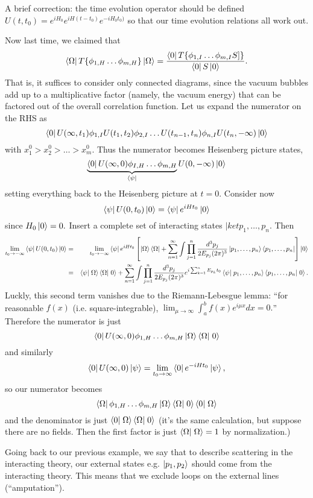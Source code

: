 A brief correction: the time evolution operator should be defined
$U(t,t_0)=e^{iH_0}e^{iH(t-t_0)}e^{-iH_0 t_0)}$ so that our time evolution relations all work out.

Now last time, we claimed that
$$\left< \Omega \right|T\{\phi_{1,H}\ldots \phi_{m,H}\}\left| \Omega \right>=\frac{\left< 0 \right|T \{\phi_{1,I}\ldots \phi_{m,I}S]\}}{\left< 0 \right|S\left| 0 \right>}.$$
That is, it suffices to consider only connected diagrams, since the vacuum bubbles add up to a multiplicative factor (namely, the vacuum energy) that can be factored out of the overall correlation function.
Let us expand the numerator on the RHS as
$$\left< 0 \right|U(\infty, t_1) \phi_{1,I} U(t_1,t_2)\phi_{2,I} \ldots U(t_{n-1},t_n)\phi_{n,I} U(t_n,-\infty)\left| 0 \right>$$
with $x_1^0 > x_2^0 > \ldots > x_m^0$. Thus the numerator becomes Heisenberg picture states,
$$\underbrace{\left< 0 \right|U(\infty,0)\phi_{I,H}\ldots \phi_{m,H}}_{\left< \psi \right|}U(0,-\infty)\left| 0 \right>$$
setting everything back to the Heisenberg picture at $t=0$. Consider now
$$\left< \psi \right|U(0,t_0)\left| 0 \right>=\left< \psi \right|e^{iHt_0}\left| 0 \right>$$
since $H_0\left| 0 \right>=0.$ Insert a complete set of interacting states $|ket{p_1,\ldots, p_n}$. Then 
\begin{eqnarray*}
\lim_{t_0\to-\infty} \bra{\psi}U(0,t_0)\ket{0}&=&
\lim_{t_0\to-\infty}\bra{\psi}e^{iHt_0}\left[\ket{\Omega}\bra{\Omega}+\sum_{n=1}^\infty \int  \prod_{j=1}^n \frac{d^3p_j}{2E_{p_j}(2\pi)^3}\ket{p_1,\ldots,p_n}\bra{p_1,\ldots,p_n}\right]\ket{0}\\
&=&\braket{\psi}{\Omega}\braket{\Omega}{0}+
\sum_{n=1}^\infty \int  \prod_{j=1}^n \frac{d^3p_j}{2E_{p_j}(2\pi)^3} e^{i\sum_{k=1}^n E_{p_k} t_0}\braket{\psi}{p_1,\ldots,p_n}\braket{p_1,\ldots,p_n}{0}.
\end{eqnarray*}
Luckly, this second term vanishes due to the Riemann-Lebesgue lemma: ``for reasonable $f(x)$ (i.e. square-integrable), $\lim_{\mu\to\infty} \int_a^b f(x)e^{i\mu x}dx=0.$'' Therefore the numerator is just
$$\bra{0}U(\infty,0)\phi_{1,H}\ldots \phi_{m,H}\ket{\Omega}\braket{\Omega}{0}$$
and similarly
$$\left< 0 \right|U(\infty,0)\left| \psi \right>=\lim_{t_0\to\infty}\left< 0 \right|e^{-iHt_0}\left| \psi \right>,$$
so our numerator becomes
$$\bra{\Omega}\phi_{1,H}\ldots \phi_{m,H}\ket{\Omega}\braket{\Omega}{0}\braket{0}{\Omega}$$
and the denominator is just $\braket{0}{\Omega}\braket{\Omega}{0}$ (it's the same calculation, but suppose there are no fields. Then the first factor is just $\braket{\Omega}{\Omega}=1$ by normalization.)

Going back to our previous example, we say that to describe scattering in the interacting theory, our external states  e.g. $\left| p_1,p_2 \right>$ should come from the interacting theory. This means that we exclude loops on the external lines (``amputation'').

